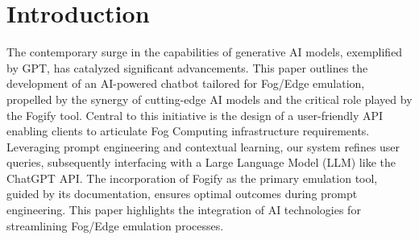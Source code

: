 \section{Introduction} \label{sec:intro}

The contemporary surge in the capabilities of generative AI models, exemplified
by GPT, has catalyzed significant advancements. This paper outlines the
development of an AI-powered chatbot tailored for Fog/Edge emulation, propelled
by the synergy of cutting-edge AI models and the critical role played by the
Fogify tool. Central to this initiative is the design of a user-friendly API
enabling clients to articulate Fog Computing infrastructure requirements.
Leveraging prompt engineering and contextual learning, our system refines user
queries, subsequently interfacing with a Large Language Model (LLM) like the
ChatGPT API. The incorporation of Fogify as the primary emulation tool, guided
by its documentation, ensures optimal outcomes during prompt engineering. This
paper highlights the integration of AI technologies for streamlining Fog/Edge
emulation processes.